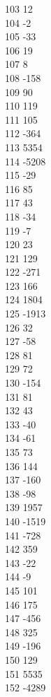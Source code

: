 { 103	12 \\
 104	-2 \\
 105	-33 \\
 106	19 \\
 107	8 \\
 108	-158 \\
 109	90 \\
 110	119 \\
 111	105 \\
 112	-364 \\
 113	5354 \\
 114	-5208 \\
 115	-29 \\
 116	85 \\
 117	43 \\
 118	-34 \\
 119	-7 \\
 120	23 \\
 121	129 \\
 122	-271 \\
 123	166 \\
 124	1804 \\
 125	-1913 \\
 126	32 \\
 127	-58 \\
 128	81 \\
 129	72 \\
 130	-154 \\
 131	81 \\
 132	43 \\
 133	-40 \\
 134	-61 \\
 135	73 \\
 136	144 \\
 137	-160 \\
 138	-98 \\
 139	1957 \\
 140	-1519 \\
 141	-728 \\
 142	359 \\
 143	-22 \\
 144	-9 \\
 145	101 \\
 146	175 \\
 147	-456 \\
 148	325 \\
 149	-196 \\
 150	129 \\
 151	5535 \\
 152	-4289 \\
}
